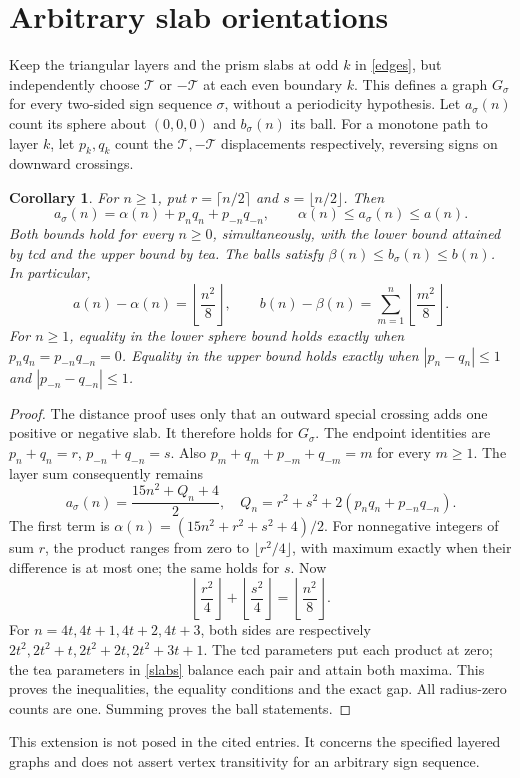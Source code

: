 \documentclass[11pt]{article}
\newtheorem{corollary}[theorem]{Corollary}
\newcommand{\T}{\mathcal T}
\begin{document}
\section{Arbitrary slab orientations}
Keep the triangular layers and the prism slabs at odd $k$ in
\eqref{edges}, but independently choose $\T$ or $-\T$ at each even
boundary $k$. This defines a graph $G_\sigma$ for every two-sided sign
sequence $\sigma$, without a periodicity hypothesis. Let $a_\sigma(n)$
count its sphere about $(0,0,0)$ and $b_\sigma(n)$ its ball. For a
monotone path to layer $k$, let $p_k,q_k$ count the $\T,-\T$
displacements respectively, reversing signs on downward crossings.

\begin{corollary}\label{arbitrary}
For $n\ge1$, put $r=\lceil n/2\rceil$ and $s=\lfloor n/2\rfloor$.
Then
\[
a_\sigma(n)=\alpha(n)+p_nq_n+p_{-n}q_{-n},\qquad
\alpha(n)\le a_\sigma(n)\le a(n).
\]
Both bounds hold for every $n\ge0$, simultaneously, with the lower
bound attained by tcd and the upper bound by tea. The balls satisfy
$\beta(n)\le b_\sigma(n)\le b(n)$. In particular,
\[
a(n)-\alpha(n)=\left\lfloor\frac{n^2}{8}\right\rfloor,
\qquad
b(n)-\beta(n)=\sum_{m=1}^n\left\lfloor\frac{m^2}{8}\right\rfloor.
\]
For $n\ge1$, equality in the lower sphere bound holds exactly when
$p_nq_n=p_{-n}q_{-n}=0$. Equality in the upper bound holds exactly when
$|p_n-q_n|\le1$ and $|p_{-n}-q_{-n}|\le1$.
\end{corollary}
\begin{proof}
The distance proof uses only that an outward special crossing adds
one positive or negative slab. It therefore holds for $G_\sigma$.
The endpoint identities are $p_n+q_n=r$, $p_{-n}+q_{-n}=s$.
Also $p_m+q_m+p_{-m}+q_{-m}=m$ for every $m\ge1$.
The layer sum consequently remains
\[
a_\sigma(n)=\frac{15n^2+Q_n+4}{2},\quad
Q_n=r^2+s^2+2(p_nq_n+p_{-n}q_{-n}).
\]
The first term is $\alpha(n)=(15n^2+r^2+s^2+4)/2$.
For nonnegative integers of sum $r$, the product ranges from zero to
$\lfloor r^2/4\rfloor$, with maximum exactly when their difference is
at most one; the same holds for $s$. Now
\[
\left\lfloor\frac{r^2}{4}\right\rfloor+
\left\lfloor\frac{s^2}{4}\right\rfloor
=\left\lfloor\frac{n^2}{8}\right\rfloor.
\]
For $n=4t,4t+1,4t+2,4t+3$, both sides are respectively
$2t^2,2t^2+t,2t^2+2t,2t^2+3t+1$.
The tcd parameters put each product at zero; the tea parameters in
\eqref{slabs} balance each pair and attain both maxima. This proves
the inequalities, the equality conditions and the exact gap.
All radius-zero counts are one. Summing proves the ball statements.
\end{proof}
This extension is not posed in the cited entries. It concerns the
specified layered graphs and does not assert vertex transitivity for
an arbitrary sign sequence.
\end{document}
